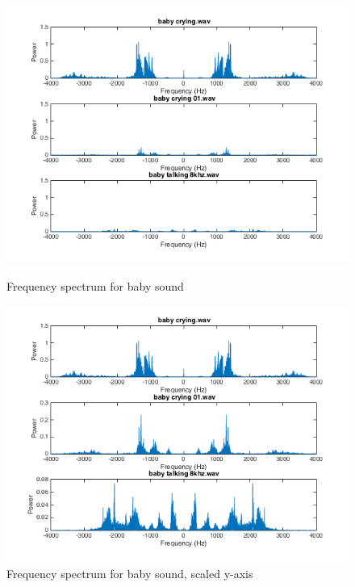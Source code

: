 \begin{figure}[!hp]
  \centering
  \begin{minipage}[b]{0.4\textwidth}
    \includegraphics[width=1\textwidth]{sections/freq_spec_baby_linkaxis.png}
    \caption{Frequency spectrum for baby sound}
    \label{fig:baby_spec}
  \end{minipage}
  \hfill
  \begin{minipage}[b]{0.4\textwidth}
    \includegraphics[width=1\textwidth]{sections/freq_spec_babyFix.png}
    \caption{Frequency spectrum for baby sound, scaled y-axis}
    \label{fig:enhanced}
  \end{minipage}
\end{figure}

